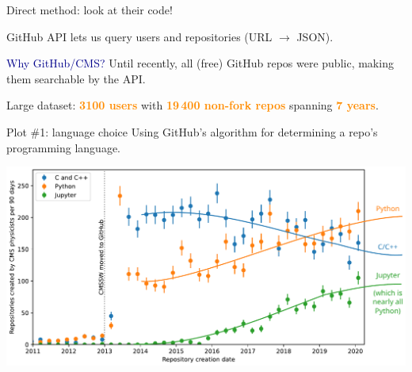 \documentclass[aspectratio=169]{beamer}
\begin{document}
\begin{frame}{Direct method: look at their code!}
\Large

\vspace{0.6 cm}
GitHub API lets us query users and repositories (URL $\to$ JSON).

\vspace{0.6 cm}
\large

\vspace{0.6 cm}
\textcolor{darkblue}{Why GitHub/CMS?} Until recently, all (free) GitHub repos were public, making them searchable by the API.

\vspace{0.6 cm}
Large dataset: \textcolor{darkorange}{\bf 3100 users} with \textcolor{darkorange}{\bf 19\,400 non-fork repos} spanning \textcolor{darkorange}{\bf 7 years}.
\end{frame}

\begin{frame}{Plot \#1: language choice}
\vspace{0.25 cm}
Using GitHub's algorithm for determining a repo's programming language.

\vspace{0.15 cm}
\includegraphics[width=\linewidth]{01-github-cmssw-language.pdf}
\end{frame}
\end{document}

